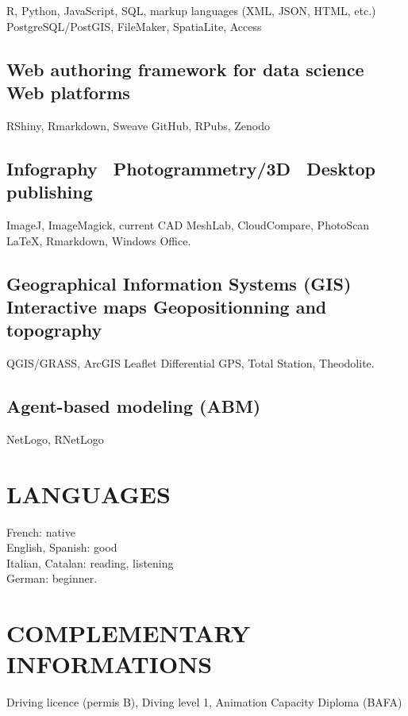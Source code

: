\documentclass[11pt]{report} %
\begin{document}
\textsf{R}, \textsf{Python}, \textsf{JavaScript}, SQL, markup languages (XML, JSON, HTML, etc.)~\textbf{{\textbar}} PostgreSQL/PostGIS, FileMaker, SpatiaLite, Access

\subsection*{Web authoring framework for data science {\textbar} Web platforms}

RShiny, Rmarkdown, Sweave \textbf{{\textbar}} GitHub, RPubs, Zenodo

\subsection*{Infography~{\textbar} Photogrammetry/3D~{\textbar} Desktop publishing}

ImageJ, ImageMagick, current CAD \textbf{{\textbar}} MeshLab, CloudCompare, PhotoScan \textbf{{\textbar}} \LaTeX, Rmarkdown, Windows Office.\textbf{}

\subsection*{Geographical Information Systems (GIS) {\textbar} Interactive maps {\textbar} Geopositionning and topography}

QGIS/GRASS, ArcGIS {\textbar} Leaflet {\textbar} Differential GPS, Total Station, Theodolite.

\subsection*{Agent-based modeling (ABM)}

NetLogo, RNetLogo

\section*{LANGUAGES}

French: native \\
English, Spanish: good \\
Italian, Catalan: reading, listening \\
German: beginner.

\section*{COMPLEMENTARY INFORMATIONS}

Driving licence (permis B), Diving level 1, Animation Capacity Diploma (BAFA)
\end{document}
